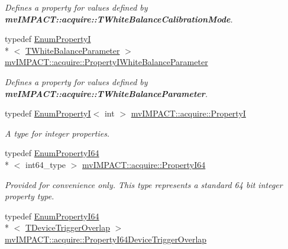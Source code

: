 \begin{DoxyCompactItemize}
\begin{DoxyCompactList}\small\item\em Defines a property for values defined by {\bfseries mv\+I\+M\+P\+A\+C\+T\+::acquire\+::\+T\+White\+Balance\+Calibration\+Mode}. \end{DoxyCompactList}\item 
\hypertarget{group___common_interface_gabdf739a9f4db49c6642a3bf50540a1b4}{typedef \hyperlink{classmv_i_m_p_a_c_t_1_1acquire_1_1_enum_property_i}{Enum\+Property\+I}\\*
$<$ \hyperlink{group___common_interface_ga7559c75a4eb1303c10ba8b611022d4c7}{T\+White\+Balance\+Parameter} $>$ \hyperlink{group___common_interface_gabdf739a9f4db49c6642a3bf50540a1b4}{mv\+I\+M\+P\+A\+C\+T\+::acquire\+::\+Property\+I\+White\+Balance\+Parameter}}\label{group___common_interface_gabdf739a9f4db49c6642a3bf50540a1b4}

\begin{DoxyCompactList}\small\item\em Defines a property for values defined by {\bfseries mv\+I\+M\+P\+A\+C\+T\+::acquire\+::\+T\+White\+Balance\+Parameter}. \end{DoxyCompactList}\item 
typedef \hyperlink{classmv_i_m_p_a_c_t_1_1acquire_1_1_enum_property_i}{Enum\+Property\+I}$<$ int $>$ \hyperlink{group___common_interface_ga12d5e434238ca242a1ba4c6c3ea45780}{mv\+I\+M\+P\+A\+C\+T\+::acquire\+::\+Property\+I}
\begin{DoxyCompactList}\small\item\em A type for integer properties. \end{DoxyCompactList}\item 
\hypertarget{group___common_interface_ga81749b2696755513663492664a18a893}{typedef \hyperlink{classmv_i_m_p_a_c_t_1_1acquire_1_1_enum_property_i64}{Enum\+Property\+I64}\\*
$<$ int64\+\_\+type $>$ \hyperlink{group___common_interface_ga81749b2696755513663492664a18a893}{mv\+I\+M\+P\+A\+C\+T\+::acquire\+::\+Property\+I64}}\label{group___common_interface_ga81749b2696755513663492664a18a893}

\begin{DoxyCompactList}\small\item\em Provided for convenience only. This type represents a standard 64 bit integer property type. \end{DoxyCompactList}\item 
\hypertarget{group___common_interface_ga2fc921dda59fa054dbcb02f41ba4d423}{typedef \hyperlink{classmv_i_m_p_a_c_t_1_1acquire_1_1_enum_property_i64}{Enum\+Property\+I64}\\*
$<$ \hyperlink{group___device_specific_interface_gabad99a0fe37e0bf5302ece4fcdd8bbe2}{T\+Device\+Trigger\+Overlap} $>$ \hyperlink{group___common_interface_ga2fc921dda59fa054dbcb02f41ba4d423}{mv\+I\+M\+P\+A\+C\+T\+::acquire\+::\+Property\+I64\+Device\+Trigger\+Overlap}}\label{group___common_interface_ga2fc921dda59fa054dbcb02f41ba4d423}


\end{DoxyCompactItemize}
